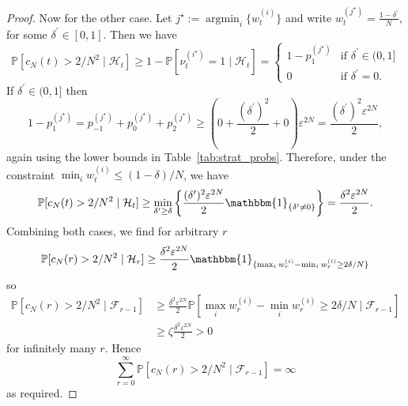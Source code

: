 \documentclass{article}
\theoremstyle{definition}
\newcommand{\Prob}{\mathbb{P}}
\newcommand{\I}[1]{\mathbbm{1}_{\{#1\}}}
\newcommand{\1}[1]{\mathbbm{1}_{#1}} %
\DeclareMathOperator*{\argmin}{argmin}
\begin{document}
\begin{proof}
Now for the other case. Let $j^\star := \argmin_i \{ w_t^{(i)} \}$ and write
$w_t^{(j^\star)} = \frac{1-\delta^\prime}{N}$, for some $\delta^\prime \in [0,1]$.
Then we have
\begin{equation*}
\Prob[ c_N(t) > 2/N^2 \mid \mathcal{H}_t ]
\geq 1- \Prob[ \nu_t^{(i^\star)} =1 \mid \mathcal{H}_t ]
=\begin{cases}
    1- p_1^{(j^\star)} & \text{if } \delta^\prime \in (0,1] \\
    0 & \text{if } \delta^\prime =0 .
\end{cases}
\end{equation*}
If $\delta^\prime \in (0,1]$ then
\begin{equation*}
1- p_1^{(j^\star)} = p_{-1}^{(j^\star)} + p_0^{(j^\star)} + p_2^{(j^\star)}
\geq \left( 0 + \frac{ (\delta^\prime)^2 }{2} + 0 \right) \varepsilon^{2N}
= \frac{ (\delta^\prime)^2 \varepsilon^{2N} }{2} ,
\end{equation*}
again using the lower bounds in Table~\ref{tab:strat_probs}.
Therefore, under the constraint $\min_i w_t^{(i)} \leq (1-\delta)/N$, we have
\begin{equation*}
\Prob[ c_N(t) > 2/N^2 \mid \mathcal{H}_t ]
\geq \min_{\delta^\prime \geq \delta} 
        \left\{ \frac{ (\delta^\prime)^2 \varepsilon^{2N} }{2} 
        \I{\delta^\prime \neq 0} \right\}
= \frac{ \delta^2 \varepsilon^{2N} }{2} .
\end{equation*}
Combining both cases, we find for arbitrary $r$
\begin{equation*}
\Prob[ c_N(r) > 2/N^2 \mid \mathcal{H}_r ] 
\geq  \frac{ \delta^2 \varepsilon^{2N} }{2}
        \I{ \max_i w_r^{(i)} - \min_i w_r^{(i)} \geq 2\delta/N }
\end{equation*}
so
\begin{align*}
\Prob[ c_N(r) > 2/N^2 \mid \mathcal{F}_{r-1} ] 
&\geq  \frac{ \delta^2 \varepsilon^{2N} }{2}
        \Prob[ \max_i w_r^{(i)} - \min_i w_r^{(i)} \geq 2\delta/N 
        \mid \mathcal{F}_{r-1} ] \\
&\geq \zeta \frac{ \delta^2 \varepsilon^{2N} }{2}
> 0
\end{align*}
for infinitely many $r$.
Hence
\begin{equation*}
\sum_{r=0}^\infty \Prob[ c_N(r) > 2/N^2  \mid \mathcal{F}_{r-1} ] = \infty
\end{equation*}
as required.
\end{proof}
\end{document}
